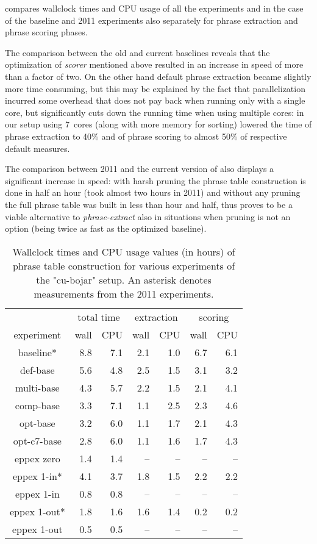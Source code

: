  compares wallclock times and CPU usage of all the
experiments and in the case of the baseline and 2011 experiments also separately for phrase
extraction and phrase scoring phases.

The comparison between the old and current baselines reveals that the optimization of
\emph{scorer} mentioned above resulted in an increase in speed of more than a factor of two.
On the other hand default phrase extraction became slightly more time consuming,
but this may be explained by the fact that parallelization incurred some overhead
that does not pay back when running only with a single core, but significantly cuts
down the running time when using multiple cores: in our setup using 7~cores (along with
more memory for sorting) lowered the time of phrase extraction to 40\% and of phrase scoring
to almost 50\% of respective default measures.

The comparison between 2011 and the current version of \eppex{} also displays a significant
increase in speed: with harsh pruning the phrase table construction is done in half an hour (took
almost two hours in 2011) and without any pruning the full phrase table was built in
less than hour and half, thus \eppex{} proves to be a viable alternative to
\emph{phrase-extract} also in situations when pruning is not an option (being twice as
fast as the optimized baseline).

\begin{table}[ht]
\centering
\begin{tabular}{ | c | r r | r r | r r | }
\hline
 & \multicolumn{2}{|c|}{total time} & \multicolumn{2}{|c|}{extraction} & \multicolumn{2}{|c|}{scoring} \\
experiment & wall & CPU & wall & CPU & wall & CPU \\
\hline
\hline
baseline*     & 8.8 & 7.1 & 2.1 & 1.0 & 6.7 & 6.1 \\
def-base      & 5.6 & 4.8 & 2.5 & 1.5 & 3.1 & 3.2 \\
multi-base    & 4.3 & 5.7 & 2.2 & 1.5 & 2.1 & 4.1 \\
comp-base     & 3.3 & 7.1 & 1.1 & 2.5 & 2.3 & 4.6 \\
opt-base      & 3.2 & 6.0 & 1.1 & 1.7 & 2.1 & 4.3 \\
opt-c7-base   & 2.8 & 6.0 & 1.1 & 1.6 & 1.7 & 4.3 \\
eppex zero    & 1.4 & 1.4 & -- & -- & -- & -- \\
\hline
eppex 1-in*   & 4.1 & 3.7 & 1.8 & 1.5 & 2.2 & 2.2 \\
eppex 1-in    & 0.8 & 0.8 & -- & -- & -- & -- \\
\hline
eppex 1-out*  & 1.8 & 1.6 & 1.6 & 1.4 & 0.2 & 0.2 \\
eppex 1-out   & 0.5 & 0.5 & -- & -- & -- & -- \\
\hline
\end{tabular}
\caption{\label{cu-bojar-time-benchmarks}
Wallclock times and CPU usage values (in hours) of phrase table
construction for various experiments of the "cu-bojar" setup.
An asterisk denotes measurements from the 2011 experiments.}
\end{table}

